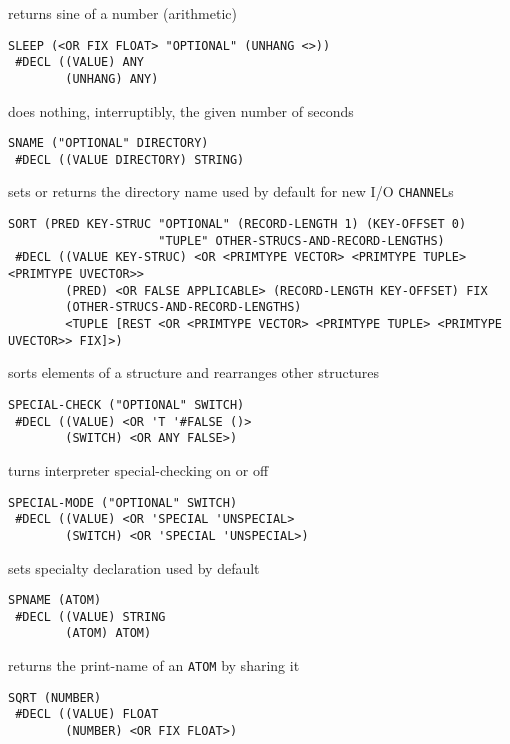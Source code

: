 \documentclass[a4paper,]{article}
\begin{document}
returns sine of a number (arithmetic)

\begin{verbatim}
SLEEP (<OR FIX FLOAT> "OPTIONAL" (UNHANG <>))
 #DECL ((VALUE) ANY
        (UNHANG) ANY)
\end{verbatim}

does nothing, interruptibly, the given number of seconds

\begin{verbatim}
SNAME ("OPTIONAL" DIRECTORY)
 #DECL ((VALUE DIRECTORY) STRING)
\end{verbatim}

sets or returns the directory name used by default for new I/O \texttt{CHANNEL}s

\begin{verbatim}
SORT (PRED KEY-STRUC "OPTIONAL" (RECORD-LENGTH 1) (KEY-OFFSET 0)
                     "TUPLE" OTHER-STRUCS-AND-RECORD-LENGTHS)
 #DECL ((VALUE KEY-STRUC) <OR <PRIMTYPE VECTOR> <PRIMTYPE TUPLE> <PRIMTYPE UVECTOR>>
        (PRED) <OR FALSE APPLICABLE> (RECORD-LENGTH KEY-OFFSET) FIX
        (OTHER-STRUCS-AND-RECORD-LENGTHS)
        <TUPLE [REST <OR <PRIMTYPE VECTOR> <PRIMTYPE TUPLE> <PRIMTYPE UVECTOR>> FIX]>)
\end{verbatim}

sorts elements of a structure and rearranges other structures

\begin{verbatim}
SPECIAL-CHECK ("OPTIONAL" SWITCH)
 #DECL ((VALUE) <OR 'T '#FALSE ()>
        (SWITCH) <OR ANY FALSE>)
\end{verbatim}

turns interpreter special-checking on or off

\begin{verbatim}
SPECIAL-MODE ("OPTIONAL" SWITCH)
 #DECL ((VALUE) <OR 'SPECIAL 'UNSPECIAL>
        (SWITCH) <OR 'SPECIAL 'UNSPECIAL>)
\end{verbatim}

sets specialty declaration used by default

\begin{verbatim}
SPNAME (ATOM)
 #DECL ((VALUE) STRING
        (ATOM) ATOM)
\end{verbatim}

returns the print-name of an \texttt{ATOM} by sharing it

\begin{verbatim}
SQRT (NUMBER)
 #DECL ((VALUE) FLOAT
        (NUMBER) <OR FIX FLOAT>)
\end{verbatim}
\end{document}
